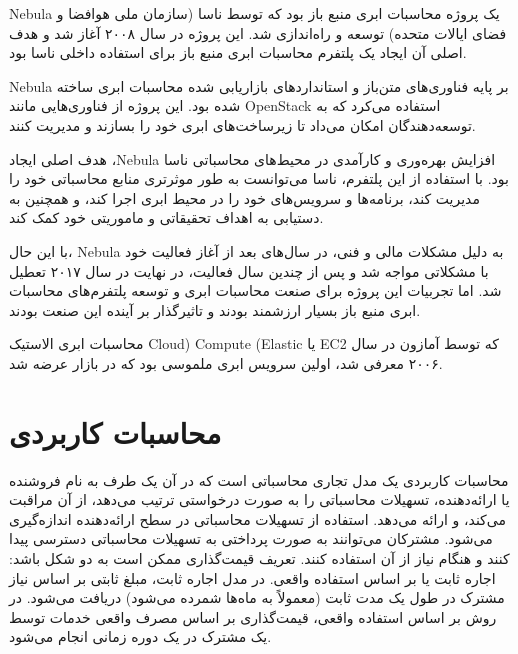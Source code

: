 \documentclass{book}
\begin{document}
            \begin{addinfo2}
                
                Nebula یک پروژه محاسبات ابری منبع باز بود که توسط ناسا (سازمان ملی هوافضا و فضای ایالات متحده) توسعه و راه‌اندازی شد. این پروژه در سال ۲۰۰۸ آغاز شد و هدف اصلی آن ایجاد یک پلتفرم محاسبات ابری منبع باز برای استفاده داخلی ناسا بود.

                Nebula بر پایه فناوری‌های متن‌باز و استانداردهای بازاریابی شده‌ محاسبات ابری ساخته شده بود. این پروژه از فناوری‌هایی مانند OpenStack استفاده می‌کرد که به توسعه‌دهندگان امکان می‌داد تا زیرساخت‌های ابری خود را بسازند و مدیریت کنند.

                هدف اصلی ایجاد ،Nebula افزایش بهره‌وری و کارآمدی در محیط‌های محاسباتی ناسا بود. با استفاده از این پلتفرم، ناسا می‌توانست به طور موثرتری منابع محاسباتی خود را مدیریت کند، برنامه‌ها و سرویس‌های خود را در محیط ابری اجرا کند، و همچنین به دستیابی به اهداف تحقیقاتی و ماموریتی خود کمک کند.

                با این حال، Nebula به دلیل مشکلات مالی و فنی، در سال‌های بعد از آغاز فعالیت خود با مشکلاتی مواجه شد و پس از چندین سال فعالیت، در نهایت در سال ۲۰۱۷ تعطیل شد. اما تجربیات این پروژه برای صنعت محاسبات ابری و توسعه پلتفرم‌های محاسبات ابری منبع باز بسیار ارزشمند بودند و تاثیرگذار بر آینده این صنعت بودند.

            \end{addinfo2}

            \begin{addinfo}
                
                محاسبات ابری الاستیک Cloud) Compute (Elastic یا EC2 که توسط آمازون در سال ۲۰۰۶ معرفی شد، اولین سرویس ابری ملموسی بود که در بازار عرضه شد.

            \end{addinfo}

        \section{محاسبات کاربردی}

            محاسبات کاربردی یک مدل تجاری محاسباتی است که در آن یک طرف به نام فروشنده یا ارائه‌دهنده، تسهیلات محاسباتی را به صورت درخواستی ترتیب می‌دهد، از آن مراقبت می‌کند، و ارائه می‌دهد. استفاده از تسهیلات محاسباتی در سطح ارائه‌دهنده اندازه‌گیری می‌شود. مشترکان می‌توانند به صورت پرداختی به تسهیلات محاسباتی دسترسی پیدا کنند و هنگام نیاز از آن استفاده کنند. تعریف قیمت‌گذاری ممکن است به دو شکل باشد: اجاره ثابت یا بر اساس استفاده واقعی. در مدل اجاره ثابت، مبلغ ثابتی بر اساس نیاز مشترک در طول یک مدت ثابت (معمولاً به ماه‌ها شمرده می‌شود) دریافت می‌شود. در روش بر اساس استفاده واقعی، قیمت‌گذاری بر اساس مصرف واقعی خدمات توسط یک مشترک در یک دوره زمانی انجام می‌شود.
\end{document}
